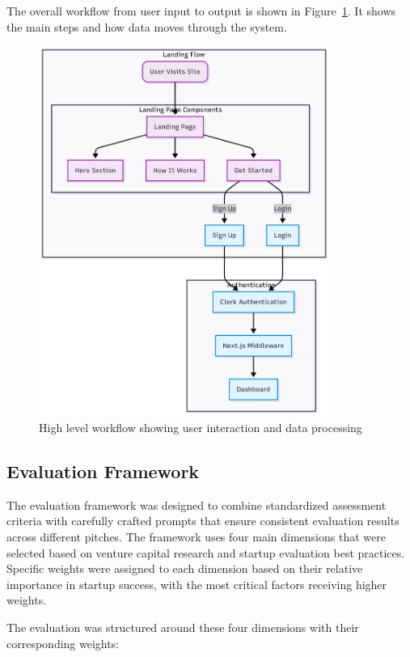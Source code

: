 The overall workflow from user input to output is shown in Figure~\ref{fig:user-flow}. It shows the main steps and how data moves through the system.

\begin{figure}[H]
  \centering
  \includegraphics[width=0.85\textwidth]{img/user-diagram-flow}
\caption{High level workflow showing user interaction and data processing}
  \label{fig:user-flow}
\end{figure}

\subsection{Evaluation Framework}\label{subsec:evaluation-framework}
The evaluation framework was designed to combine standardized assessment criteria with carefully crafted prompts that ensure consistent evaluation results across different pitches. The framework uses four main dimensions that were selected based on venture capital research and startup evaluation best practices. Specific weights were assigned to each dimension based on their relative importance in startup success, with the most critical factors receiving higher weights.

The evaluation was structured around these four dimensions with their corresponding weights:

